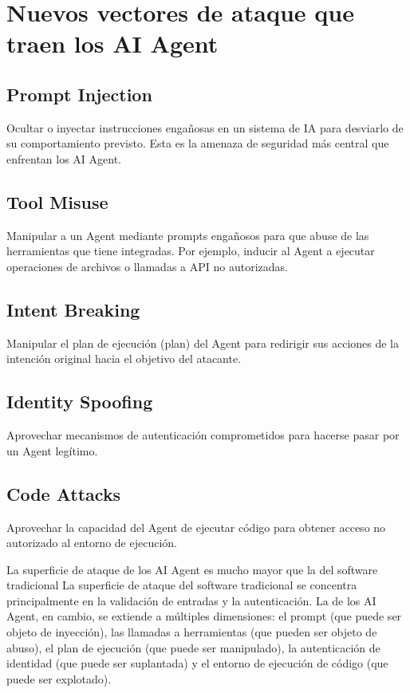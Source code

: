 \section{Nuevos vectores de ataque que traen los AI Agent}

\subsection{Prompt Injection}

Ocultar o inyectar instrucciones engañosas en un sistema de IA para desviarlo de su comportamiento previsto. Esta es la amenaza de seguridad más central que enfrentan los AI Agent.

\subsection{Tool Misuse}

Manipular a un Agent mediante prompts engañosos para que abuse de las herramientas que tiene integradas. Por ejemplo, inducir al Agent a ejecutar operaciones de archivos o llamadas a API no autorizadas.

\subsection{Intent Breaking}

Manipular el plan de ejecución (plan) del Agent para redirigir sus acciones de la intención original hacia el objetivo del atacante.

\subsection{Identity Spoofing}

Aprovechar mecanismos de autenticación comprometidos para hacerse pasar por un Agent legítimo.

\subsection{Code Attacks}

Aprovechar la capacidad del Agent de ejecutar código para obtener acceso no autorizado al entorno de ejecución.

\begin{warningbox}{La superficie de ataque de los AI Agent es mucho mayor que la del software tradicional}
La superficie de ataque del software tradicional se concentra principalmente en la validación de entradas y la autenticación. La de los AI Agent, en cambio, se extiende a múltiples dimensiones: el prompt (que puede ser objeto de inyección), las llamadas a herramientas (que pueden ser objeto de abuso), el plan de ejecución (que puede ser manipulado), la autenticación de identidad (que puede ser suplantada) y el entorno de ejecución de código (que puede ser explotado).
\end{warningbox}

